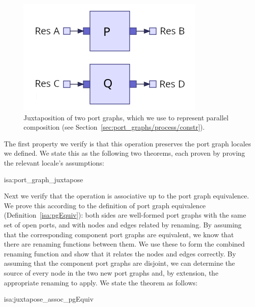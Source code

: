 \documentclass[class=smolathesis,crop=false]{standalone}
\begin{document}
\begin{figure}[htbp]
  \centering
  \includegraphics[scale=0.4]{img/par_port_graph_simpler.png}
  \caption{Juxtaposition of two port graphs, which we use to represent parallel composition (see Section~\ref{sec:port_graphs/process/constr}).}
  \label{fig:juxtapose}
\end{figure}

The first property we verify is that this operation preserves the port graph locales we defined.
We state this as the following two theorems, each proven by proving the relevant locale's assumptions:
\begin{isalemma}{isa:port_graph_juxtapose}
  \begin{minipage}{0.49\textwidth}
    
  \end{minipage}
  \vrule\kern5pt
  \begin{minipage}{0.49\textwidth}
    
  \end{minipage}
\end{isalemma}

Next we verify that the operation is associative up to the port graph equivalence.
We prove this according to the definition of port graph equivalence (Definition~\ref{isa:pgEquiv}): both sides are well-formed port graphs with the same set of open ports, and with nodes and edges related by renaming.
By assuming that the corresponding component port graphs are equivalent, we know that there are renaming functions between them.
We use these to form the combined renaming function and show that it relates the nodes and edges correctly.
By assuming that the component port graphs are disjoint, we can determine the source of every node in the two new port graphs and, by extension, the appropriate renaming to apply.
We state the theorem as follows:
\begin{isalemma}{isa:juxtapose_assoc_pgEquiv}
  
\end{isalemma}
\end{document}
